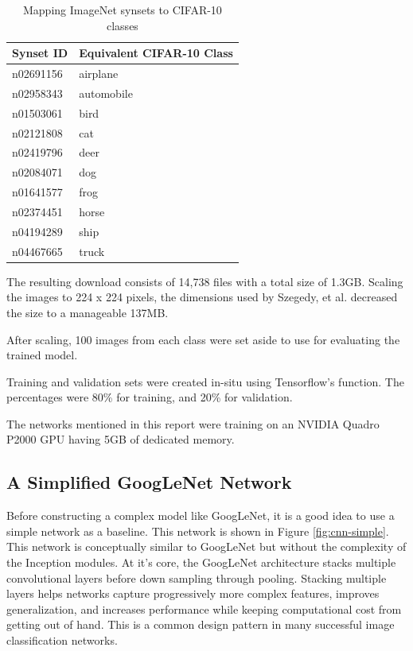 \documentclass{article}
\begin{document}
\begin{table}[ht]
    \centering
    \begin{tabular}{ll}
    \hline
    \textbf{Synset ID} & \textbf{Equivalent CIFAR-10 Class} \\ \hline
    n02691156 & airplane \\ \hline
    n02958343 & automobile \\ \hline
    n01503061 & bird \\ \hline
    n02121808 & cat \\ \hline
    n02419796 & deer \\ \hline
    n02084071 & dog \\ \hline
    n01641577 & frog \\ \hline
    n02374451 & horse \\ \hline
    n04194289 & ship \\ \hline
    n04467665 & truck \\ \hline
    \end{tabular}
    \caption{Mapping ImageNet synsets to CIFAR-10 classes}
    \label{tab:synsets}
\end{table}

The resulting download consists of 14,738 files with a total size of 1.3GB. Scaling the images to 224 x 224 pixels, the dimensions used by Szegedy, et al. decreased the size to a manageable 137MB.

After scaling, 100 images from each class were set aside to use for evaluating the trained model.

Training and validation sets were created in-situ using Tensorflow's  function. The percentages were 80\% for training, and 20\% for validation.

The networks mentioned in this report were training on an NVIDIA Quadro P2000 GPU having 5GB of dedicated memory.

\subsection{A Simplified GoogLeNet Network}
\label{subsec:simple_model}
Before constructing a complex model like GoogLeNet, it is a good idea to use a simple network as a baseline. This network is shown in Figure \ref{fig:cnn-simple}. This network is conceptually similar to GoogLeNet but without the complexity of the Inception modules. At it's core, the GoogLeNet architecture stacks multiple convolutional layers before down sampling through pooling. Stacking multiple layers helps networks capture progressively more complex features, improves generalization, and increases performance while keeping computational cost from getting out of hand. This is a common design pattern in many successful image classification networks\cite{simonyan2014very}.
\end{document}
